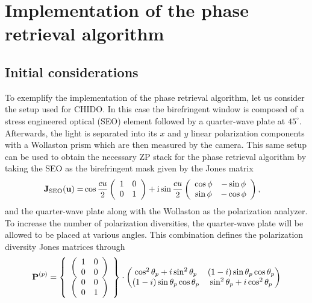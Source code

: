 \documentclass[reprint,aps,pra,superscriptaddress,
amsmath,amssymb]{revtex4-1}
\begin{document}
\section{Implementation of the phase retrieval algorithm}

\subsection{Initial considerations}

To exemplify the implementation of the phase retrieval algorithm, let us consider the setup used for CHIDO. In this case the birefringent window is composed of a stress engineered optical (SEO) element followed by a quarter-wave plate at $45^{\circ}$. Afterwards, the light is separated into its $x$ and $y$ linear polarization components with a Wollaston prism which are then measured by the camera. This same setup can be used to obtain the necessary ZP stack for the phase retrieval algorithm by taking the SEO as the birefringent mask given by the Jones matrix
\begin{align}
\textbf J_\text{SEO} (\textbf u) = & \cos \frac{c u}{2}
\left( \begin{array}{cc}
1 & 0 \\
0 & 1 
\end{array}
\right)
+ \text{i} \sin \frac{c u}{2}
\left( \begin{array}{cc}
\cos \phi & -\sin \phi \\
\sin \phi & - \cos \phi 
\end{array}
\right),
\end{align}
and the quarter-wave plate along with the Wollaston as the polarization analyzer.  To increase the number of polarization diversities, the quarter-wave plate will be allowed to be placed at various angles. This combination defines the polarization diversity Jones matrices through
\begin{align}
\textbf P^{(p)} = \left\{ \begin{array}{c}
\left(
\begin{array}{cc}
1 & 0 \\
0 & 0 
\end{array}
\right) \\
\left(
\begin{array}{cc}
0 & 0 \\
0 & 1 
\end{array}
\right) 
\end{array}
\right\}
\cdot
{\begin{pmatrix}\cos ^{2}\theta_p +i\sin ^{2}\theta_p &(1-i)\sin \theta_p \cos \theta_p \\(1-i)\sin \theta_p \cos \theta_p &\sin ^{2}\theta_p +i\cos ^{2}\theta_p \end{pmatrix}}
\end{align}
\end{document}
